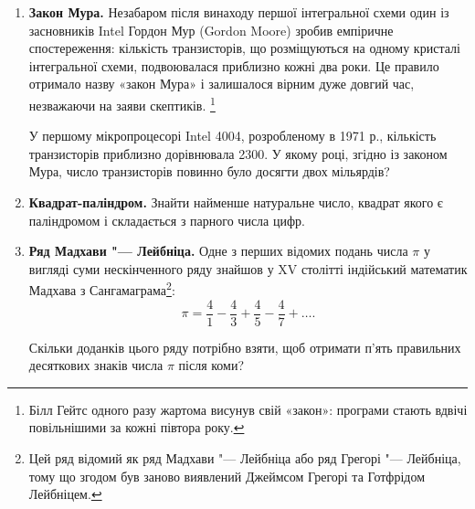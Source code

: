 \begin{enumerate}
\item \textbf{Закон Мура.} Незабаром після винаходу першої інтегральної схеми один із засновників Intel Гордон Мур (Gordon Moore) зробив емпіричне спостереження: кількість транзисторів, що розміщуються на одному кристалі інтегральної схеми, подвоювалася приблизно кожні два роки. Це правило отримало назву «закон Мура» і залишалося вірним дуже довгий час, незважаючи на заяви скептиків. \footnote[1]{Білл Гейтс одного разу жартома висунув свій «закон»: програми стають вдвічі повільнішими за кожні півтора року.}

У першому мікропроцесорі Intel 4004, розробленому в 1971 р., кількість транзисторів приблизно дорівнювала 2300. У якому році, згідно із законом Мура, число транзисторів повинно було досягти двох мільярдів?
\item \textbf{Квадрат-паліндром.} Знайти найменше натуральне число, квадрат якого є паліндромом і складається з парного числа цифр.
\item \textbf{Ряд Мадхави "--- Лейбніца.} Одне з перших відомих подань числа $\pi$ у вигляді суми нескінченного ряду знайшов у XV столітті індійський математик Мадхава з Сангамаграма\footnote[3]{Цей ряд відомий як ряд Мадхави "--- Лейбніца або ряд Грегорі "--- Лейбніца, тому що згодом був заново виявлений Джеймсом Грегорі та Готфрідом Лейбніцем.}:
$$
\pi=\frac{4}{1}-\frac{4}{3}+\frac{4}{5}-\frac{4}{7}+\ldots.
$$

Скільки доданків цього ряду потрібно взяти, щоб отримати п'ять правильних десяткових знаків числа $\pi$ після коми?

\end{enumerate}




